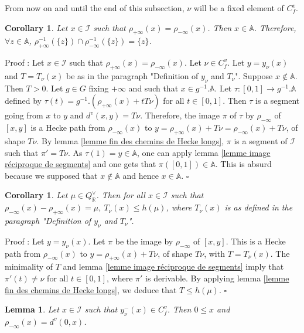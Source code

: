 \documentclass[12pt]{article}
\theoremstyle{plain}
\newtheorem{cor}[thm]{Corollary}
\newtheorem{lemme}[thm]{Lemma}
\theoremstyle{definition}
\newcommand{\R}{\mathbb{R}}
\newcommand{\A}{\mathbb{A}}
\newcommand{\I}{\mathcal{I}}
\begin{document}
From now on and until the end of this subsection, $\nu$ will be a fixed element of $C_f^v$.

\begin{cor}\label{cor points ayant meme image par les rétractions}
 Let $x\in\mathcal{I}$ such that $\rho_{+\infty}(x)=\rho_{-\infty}(x)$. Then $x\in \mathbb{A}$. Therefore, $\forall z\in \mathbb{A}$, $\rho_{+\infty}^{-1}(\{z\})\cap\rho_{-\infty}^{-1}(\{z\})=\{z\}$.
\end{cor}


Proof :  Let $x\in\mathcal{I}$ such that $\rho_{+\infty}(x)=\rho_{-\infty}(x)$. Let $\nu\in C_f^v$. Let $y=y_\nu(x)$ and $T=T_\nu(x)$ be as in the paragraph "Definition of $y_\nu$ and $T_\nu$". Suppose $x\notin \mathbb{A}$. Then $T>0$. Let $g\in G$ fixing $+\infty$ and such that $x\in g^{-1}.\A$. Let $\tau:[0,1]\rightarrow g^{-1}.\A$ defined by $\tau(t)=g^{-1}.(\rho_{+\infty}(x)+tT\nu)$ for all $t\in [0,1]$. Then $\tau$ is a segment going from $x$ to $y$ and $d^v(x,y)=T\nu$. Therefore, the image $\pi$ of $\tau$ by $\rho_{-\infty}$ of $[x,y]$ is a Hecke path from $\rho_{-\infty}(x)$ to $y=\rho_{+\infty}(x)+T\nu=\rho_{-\infty}(x)+T\nu$, of shape $T\nu$. By lemma \ref{lemme fin des chemins de Hecke longs}, $\pi$ is a segment of $\mathcal{I}$ such that $\pi'=T\nu$. As $\tau(1)=y\in \A$, one can apply lemma \ref{lemme image réciproque de segments} and one gets that $\pi([0,1])\in \mathbb{A}$. This is absurd because we supposed that $x\notin \mathbb{ A}$ and hence $x\in \mathbb{A}$. $\square$

\begin{cor}\label{corollaire majoration de T}
Let $\mu\in Q^\vee_\R$. Then for all $x\in \I$ such that $\rho_{-\infty}(x)-\rho_{+\infty}(x)=\mu$, $T_\nu(x)\leq h(\mu)$, where $T_\nu(x)$ is as defined in the paragraph "Definition of $y_\nu$ and $T_\nu$".
\end{cor}

Proof : Let $y=y_\nu(x)$. Let $\pi$ be the image by $\rho_{-\infty}$ of $[x,y]$. This is a Hecke path from $\rho_{-\infty}(x)$ to $y=\rho_{+\infty}(x)+T\nu$, of shape $T\nu$, with $T=T_\nu(x)$. The minimality of $T$ and lemma \ref{lemme image réciproque de segments} imply that $\pi'(t)\neq \nu$ for all $t\in [0,1]$, where $\pi'$ is derivable. By applying lemma \ref{lemme fin des chemins de Hecke longs}, we deduce that $T\leq h(\mu)$. $\square$




\begin{lemme}\label{lemme_rétraction et distance vectorielle}
Let $x\in \mathcal{I}$ such that $y_\nu^-(x)\in C^v_f$. Then $0\leq x$ and $\rho_{-\infty}(x)=d^v(0,x)$.
\end{lemme}
\end{document}
